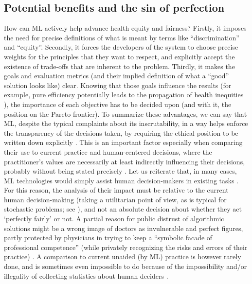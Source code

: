 \subsection{Potential benefits and the sin of perfection}
    How can ML actively help advance health equity and fairness?
    Firstly, it imposes the need for precise definitions of what is meant by terms like ``discrimination'' and ``equity''.
    Secondly, it forces the developers of the system to choose precise weights for the principles that they want to respect, and explicitly accept the existence of trade-offs that are inherent to the problem.
    Thirdly, it makes the goals and evaluation metrics (and their implied definition of what a ``good'' solution looks like) clear.
    Knowing that those goals influence the results \cite{Dijkstra2020} (for example, pure efficiency potentially leads to the propagation of health inequities \cite[p.~2]{Rajkomar2018}), the importance of each objective has to be decided upon (and with it, the position on the Pareto frontier).
    To summarize these advantages, we can say that ML, despite the typical complaints about its inscrutability, in a way helps enforce the transparency of the decisions taken, by requiring the ethical position to be written down explicitly \cite{Williamson2021}.
    This is an important factor especially when comparing their use to current practice and human-centered decisions, where the practitioner's values are necessarily at least indirectly influencing their decisions, probably without being stated precisely .
    Let us reiterate that, in many cases, ML technologies would simply assist human decision-makers in existing tasks \cite[p.~2]{Morley2020}.
    For this reason, the analysis of their impact must be relative to the current human decision-making (taking a utilitarian point of view, as is typical for stochastic problems; see \cite{Hardin1989}), and not an absolute decision about whether they act `perfectly fairly' or not.
    A partial reason for public distrust of algorithmic solutions might be a wrong image of doctors as invulnerable and perfect figures, partly protected by physicians in trying to keep a ``symbolic facade of professional competence'' (while privately recognizing the risks and errors of their practice) \cite{Waring2005}.
    A comparison to current unaided (by ML) practice is however rarely done, and is sometimes even impossible to do because of the impossibility and/or illegality of collecting statistics about human deciders \cite{Williamson2021}.

